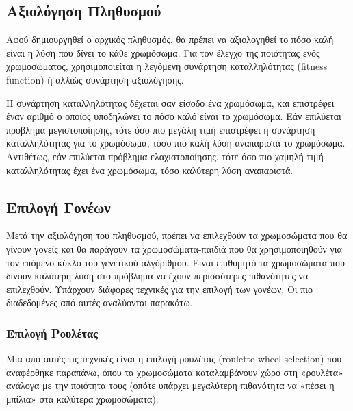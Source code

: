 \subsection{Αξιολόγηση Πληθυσμού}


Αφού δημιουργηθεί ο αρχικός πληθυσμός, θα πρέπει να αξιολογηθεί το πόσο καλή είναι η λύση που δίνει το κάθε χρωμόσωμα. Για τον έλεγχο της ποιότητας ενός χρωμοσώματος, χρησιμοποιείται η λεγόμενη συνάρτηση καταλληλότητας (fitness function) ή αλλιώς συνάρτηση αξιολόγησης.

Η συνάρτηση καταλληλότητας δέχεται σαν είσοδο ένα χρωμόσωμα, και επιστρέφει έναν αριθμό ο οποίος υποδηλώνει το πόσο καλό είναι το χρωμόσωμα. Εάν επιλύεται πρόβλημα μεγιστοποίησης, τότε όσο πιο μεγάλη τιμή επιστρέφει η συνάρτηση καταλληλότητας για το χρωμόσωμα, τόσο πιο καλή λύση αναπαριστά το χρωμόσωμα. Αντιθέτως, εάν επιλύεται πρόβλημα ελαχιστοποίησης, τότε όσο πιο χαμηλή τιμή καταλληλότητας έχει ένα χρωμόσωμα, τόσο καλύτερη λύση αναπαριστά.

\subsection{Επιλογή Γονέων}

Μετά την αξιολόγηση του πληθυσμού, πρέπει να επιλεχθούν τα χρωμοσώματα που θα γίνουν γονείς και θα παράγουν τα χρωμοσώματα-παιδιά που θα χρησιμοποιηθούν για τον επόμενο κύκλο του γενετικού αλγόριθμου. Είναι επιθυμητό τα χρωμοσώματα που δίνουν καλύτερη λύση στο πρόβλημα να έχουν περισσότερες πιθανότητες να επιλεχθούν. Υπάρχουν διάφορες τεχνικές για την επιλογή των γονέων. Οι πιο διαδεδομένες από αυτές αναλύονται παρακάτω.

\subsubsection{Επιλογή Ρουλέτας}

Μία από αυτές τις τεχνικές είναι η επιλογή ρουλέτας (roulette wheel selection) που αναφέρθηκε παραπάνω, όπου τα χρωμοσώματα καταλαμβάνουν χώρο στη «ρουλέτα» ανάλογα με την ποιότητα τους (οπότε υπάρχει μεγαλύτερη πιθανότητα να «πέσει η μπίλια» στα καλύτερα χρωμοσώματα).

